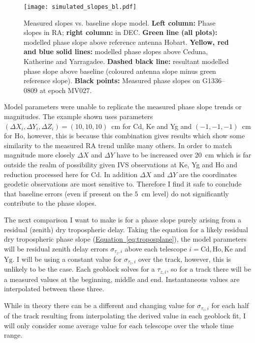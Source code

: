 		\begin{figure}[H]
			\centering
			\texttt{[image: simulated\_slopes\_bl.pdf]}
			\caption[]{Measured slopes vs. baseline slope model. \textbf{Left column:} Phase slopes in RA; \textbf{right column:} in DEC. \textbf{Green line (all plots):} modelled phase slope above reference antenna Hobart. \textbf{ Yellow, red and blue solid lines:} modelled phase slopes above Ceduna, Katherine and Yarragadee. \textbf{Dashed black line:} resultant modelled phase slope above baseline (coloured antenna slope minus green reference slope). \textbf{Black points:} Measured phase slopes on G1336--0809 at epoch MV027.} \label{fig:baselineplanecompare}
		\end{figure}
		\clearpage
				
		Model parameters were unable to replicate the measured phase slope trends or magnitudes. The example shown uses parameters $(\Delta X_i, \Delta Y_i, \Delta Z_i)=(10,10,10)$~cm for Cd, Ke and Yg and $(-1,-1,-1)$~cm for Ho, however, this is because this combination gives results which show some similarity to the measured RA trend unlike many others. In order to match magnitude more closely $\Delta X$ and $\Delta Y$ have to be increased over 20~cm which is far outside the realm of possibility given IVS observations at Ke, Yg and Ho and reduction processed here for Cd. In addition $\Delta X$ and $\Delta Y$ are the coordinates geodetic observations are most sensitive to. Therefore I find it safe to conclude that baseline errors (even if present on the $5$~cm level) do not significantly contribute to the phase slopes.
		
		The next comparison I want to make is for a phase slope purely arising from a residual (zenith) dry tropospheric delay. Taking the equation for a likely residual dry tropospheric phase slope (\hyperref[eq:troposplane]{Equation~\ref*{eq:troposplane}}), the model parameters will be residual zenith delay errors $\sigma_{\tau_z,i}$ above each telescope $i=\text{Cd}, \text{Ho}, \text{Ke}$ and $\text{Yg}$. I will be using a constant value for $\sigma_{\tau_z,i}$ over the track, however, this is unlikely to be the case. Each geoblock solves for a $\tau_{z,i}$, so for a track there will be a measured values at the beginning, middle and end. Instantaneous values are interpolated between these three. 
		
		While in theory there can be a different and changing value for $\sigma_{\tau_z,i}$ for each half of the track resulting from interpolating the derived value in each geoblock fit, I will only consider some average value for each telescope over the whole time range.
		

